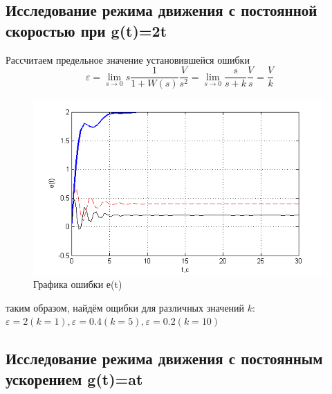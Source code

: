 \documentclass[a4paper, 11pt]{article}
\begin{document}
\subsection{Исследование режима движения с постоянной скоростью при g(t)=2t}
Рассчитаем предельное значение установившейся ошибки
\[\varepsilon  = \mathop {\lim }\limits_{s \to 0} s\frac{1}{{1 + W(s)}}\frac{V}{{{s^2}}} = \mathop {\lim }\limits_{s \to 0} \frac{s}{{s + k}}\frac{V}{s} = \frac{V}{k}\]


\begin{center}

	\begin{figure}[h]
		\centering
			\includegraphics[width=0.7\linewidth]{6}
		\caption{Графика ошибки е(t)}
		\label{fig:6}
	\end{figure}
\end{center}

таким образом, найдём ощибки для различных значений $k$:
$\varepsilon=2 (k=1), \varepsilon=0.4 (k=5), \varepsilon=0.2 (k=10)$

\subsection{Исследование режима движения с постоянным ускорением g(t)=at}
\end{document}
